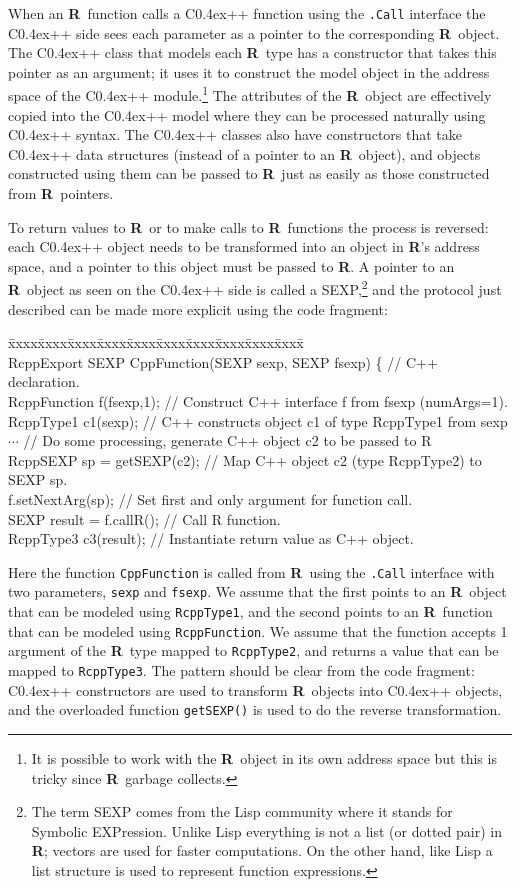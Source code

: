 \documentclass{article}
\newenvironment{program}{\ttfamily\begin{tabbing}
\=xxxx\=xxxx\=xxxx\=xxxx\=xxxx\=xxxx\=xxxx\=xxxx\=xxxx\=xxxx\= \+ \kill \\
}{\end{tabbing}}
\def\C++{C{\raise 0.4ex\hbox{\tiny ++}}}
\newcommand{\R}{{\bf R}}
\begin{document}
When an \R\ function calls a \C++ function using the {\tt .Call} interface
the \C++ side sees each parameter as a pointer to the corresponding
\R\ object. The \C++ class that models each \R\ type has a constructor
that takes this pointer as an argument; it uses it to construct
the model object in the address space of the \C++ module.\footnote{It is
  possible to work with the \R\ object in its own address space but this
  is tricky since \R\ garbage collects.}
The attributes of the \R\ object are effectively copied into the \C++
model where they can be processed naturally using \C++ syntax. The
\C++ classes also have constructors that take \C++ data structures (instead
of a pointer to an \R\ object), and objects constructed using them
can be passed to \R\ just as easily as those constructed from \R\
pointers.

To return values to \R\ or to make calls to \R\ functions the process
is reversed: each \C++ object needs to be transformed into an object
in \R's address space, and a pointer to this object must be passed
to \R. A pointer to an \R\ object as seen on the \C++ side is called
a SEXP,\footnote{The term SEXP comes
  from the Lisp community where it stands for Symbolic EXPression. Unlike
  Lisp everything is not a list (or dotted pair) 
  in \R; vectors are used for faster
  computations. On the other hand, like Lisp a list structure is used
  to represent function expressions.}
 and the protocol just described can be made more explicit using the
 code fragment:
\begin{program}
  RcppExport SEXP CppFunction(SEXP sexp, SEXP fsexp) \{ // C++ declaration.\\
\> RcppFunction f(fsexp,1); // Construct C++ interface f from fsexp (numArgs=1).\\
\> RcppType1 c1(sexp); // C++ constructs object c1 of type RcppType1 from sexp\\
\> $\cdots$ // Do some processing, generate C++ object c2 to be passed to R\\
\> RcppSEXP sp = getSEXP(c2); // Map C++ object c2 (type RcppType2) to SEXP sp.\\
\> f.setNextArg(sp); // Set first and only argument for function call.\\
\> SEXP result = f.callR(); // Call R function.\\
\> RcppType3 c3(result); // Instantiate return value as C++ object.
\end{program}

Here the function {\tt CppFunction} is called from \R\ using the {\tt .Call}
interface with two parameters, {\tt sexp} and {\tt fsexp}. We assume that
the first points to an \R\ object that can be modeled using {\tt RcppType1},
and the second points to an \R\ function that can be modeled using
{\tt RcppFunction}. We assume that the function accepts 1 argument of the
\R\ type mapped to {\tt RcppType2}, and returns a value that can be mapped
to {\tt RcppType3}. The pattern should be clear from the code fragment:
\C++ constructors are used to transform \R\ objects into \C++ objects,
and the overloaded function {\tt getSEXP()} is used to do the reverse
transformation. 
\end{document}
